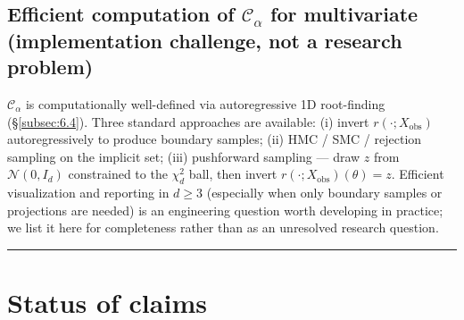 \documentclass[11pt]{article}
\begin{document}
\subsection{Efficient computation of \(\mathcal{C}_\alpha\) for
multivariate (implementation challenge, not a research problem)}\label{subsec:11.8}
\(\mathcal{C}_\alpha\) is computationally well-defined via autoregressive
1D root-finding (\S\ref{subsec:6.4}). Three standard approaches are
available: (i) invert \(r(\cdot; X_\mathrm{obs})\) autoregressively to
produce boundary samples; (ii) HMC / SMC / rejection sampling on the
implicit set; (iii) pushforward sampling --- draw \(z\) from
\(\mathcal{N}(0, I_d)\) constrained to the \(\chi^2_d\) ball, then
invert \(r(\cdot; X_\mathrm{obs})(\theta) = z\). Efficient visualization
and reporting in \(d \ge 3\) (especially when only boundary samples or
projections are needed) is an engineering question worth developing in
practice; we list it here for completeness rather than as an unresolved
research question.

\medskip\hrule\medskip

\section*{Status of claims}
\end{document}
